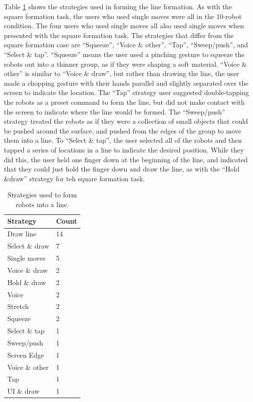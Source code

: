Table \ref{tab:line_strategies} shows the strategies used in forming the line formation. 
As with the square formation task, the users who used single moves were all in the 10-robot condition. 
The four users who used single moves all also used single moves when presented with the square formation task. 
The strategies that differ from the square formation case are ``Squeeze'', ``Voice \& other'', ``Tap'', ``Sweep/push'', and ``Select \& tap''. 
``Squeeze'' means the user used a pinching gesture to squeeze the robots out into a thinner group, as if they were shaping a soft material. 
``Voice \& other'' is similar to ``Voice \& draw'', but rather than drawing the line, the user made a chopping gesture with their hands parallel and slightly separated over the screen to indicate the location. 
The ``Tap'' strategy user suggested double-tapping the robots as a preset command to form the line, but did not make contact with the screen to indicate where the line would be formed. 
The ``Sweep/push'' strategy treated the robots as if they were a collection of small objects that could be pushed around the surface, and pushed from the edges of the group to move them into a line. 
To ``Select \& tap'', the user selected all of the robots and then tapped a series of locations in a line to indicate the desired position.
While they did this, the user held one finger down at the beginning of the line, and indicated that they could just hold the finger down and draw the line, as with the ``Hold \&draw'' strategy for teh square formation task. 

\begin{table}
	\begin{tabular}{l l}
		Strategy & Count\\
		\hline
		Draw line & 14\\
		Select \& draw & 7\\
		Single moves & 5\\
		Voice \& draw & 2\\
		Hold \& draw & 2\\
		Voice & 2\\
		Stretch & 2\\
		Squeeze & 2\\
		Select \& tap & 1 \\
		Sweep/push & 1\\
		Screen Edge & 1\\
		Voice \& other & 1\\
		Tap & 1 \\
		UI \& draw & 1\\
	\end{tabular}
	\caption{Strategies used to form robots into a line.}
	\label{tab:line_strategies}
\end{table}

